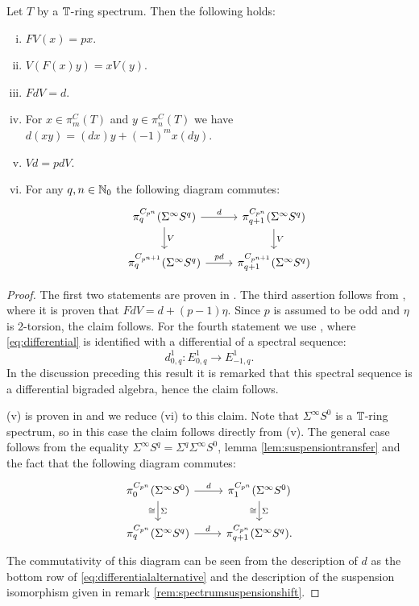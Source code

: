 \begin{lem}\label{lem:wittcomplexrelations} Let $T$ by a $\mathbb{T}$-ring spectrum. Then the following holds:
\begin{enumerate}[(i)]
\item $FV(x) = px$.
\item $V(F(x)y) = xV(y)$.
\item $FdV = d$.
\item For $x\in \pi_m^C(T)$ and $y\in \pi_n^C(T)$ we have $d(xy) = (dx)y + (-1)^m x(dy)$.
\item $Vd = pdV$.
\item For any $q,n\in \mathbb{N}_0$ the following diagram commutes:
\[
\begin{tikzcd}
\pi_q^{C_{p^n}}(\Sigma^\infty S^q)
\arrow{r}{d}\arrow{d}{V}
&\pi_{q+1}^{C_{p^n}}(\Sigma^\infty S^q)
\arrow{d}{V}\\
\pi_q^{C_{p^{n+1}}}(\Sigma^\infty S^q)
\arrow{r}{pd}
&\pi_{q+1}^{C_{p^{n+1}}}(\Sigma^\infty S^q)
\end{tikzcd}
\] 
\end{enumerate}
\end{lem}

\begin{proof}
The first two statements are proven in \cite[Lemma~3.3, \pno~52]{hmperfect}.
The third assertion
follows from \cite[Lemma~1.5.1, \pno~16]{hesselholtacta}, where it is proven
that $FdV = d + (p-1)\eta$. Since $p$ is assumed to be odd and $\eta$
is 2-torsion, the claim follows.
For the fourth statement we use \cite[Lemma~1.4.2, \pno~11]{hesselholtacta},
where \eqref{eq:differential} is identified with a differential of a 
spectral sequence:
\[
d^1_{0,q}:E^1_{0,q}\to E^1_{-1, q}.
\]  
In the discussion preceding this result it is remarked that this spectral
sequence is a differential bigraded algebra, hence the claim follows.

(v) is proven in \cite[Lemma~1.2.1, \pno~8]{hmmixed} and we reduce (vi) to this claim.
Note that $\Sigma^\infty S^0$ is a $\mathbb{T}$-ring spectrum, so in this case the claim follows directly
from (v). The general case follows from the equality $\Sigma^\infty S^q = \Sigma^q\Sigma^\infty S^0$,
lemma \ref{lem:suspensiontransfer} and the fact that the following diagram commutes:
\[
\begin{tikzcd}
\pi_0^{C_{p^n}} (\Sigma^\infty S^0)
\arrow{d}[swap]{\cong}{\Sigma}\arrow{r}{d}
&\pi_1^{C_{p^n}} (\Sigma^\infty S^0)
\arrow{d}[swap]{\cong}{\Sigma}
\\
\pi_q^{C_{p^n}} (\Sigma^\infty S^q)
\arrow{r}{d}
&\pi_{q+1}^{C_{p^n}} (\Sigma^\infty S^q).
\end{tikzcd}
\]
The commutativity of this diagram can be seen from the description of $d$ as the
bottom row of \eqref{eq:differentialalternative} and the description
of the suspension isomorphism given in remark \ref{rem:spectrumsuspensionshift}.
\end{proof}





